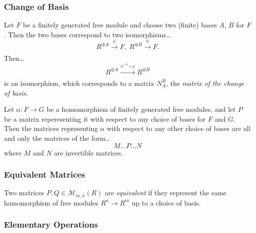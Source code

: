 \subsubsection{Change of Basis}\label{changeofbasis}
Let $F$ be a finitely generated free module and choose two (finite) bases $A$, $B$ for $F$. Then the two bases correspond
to two isomorphisms\dots
$$R^{\oplus A} \xrightarrow[]{\varphi} F, \; R^{\oplus B} \xrightarrow[]{\psi} F.$$
Then\dots
$$R^{\oplus A} \xrightarrow[]{\psi^{-1} \circ \varphi} R^{\oplus B}$$
is an isomorphism, which corresponds to a matrix $N^B_A$, the \emph{matrix of the change of basis}.

\begin{proposition}
Let $\alpha : F \rightarrow G$ be a homomorphism of finitely generated free modules, and let $P$ be a matrix reperesenting
it with respect to any choice of bases for $F$ and $G$. Then the matrices representing $\alpha$ with respect to any other
choice of bases are all and only the matrices of the form\dots
$$M \dots P \dots N$$
where $M$ and $N$ are invertible matrices.

\subsubsection{Equivalent Matrices}\label{equivalentmatrices}
Two matrices $P, Q \in \mathcal{M}_{m,n}(R)$ are \emph{equivalent} if they represent the same homomorphism of free modules
$R^n \rightarrow R^m$ up to a choice of basis.
\end{proposition}

\subsubsection{Elementary Operations}